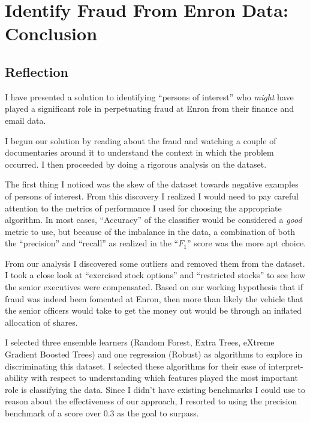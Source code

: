 \documentclass[titlepage,numbers=noenddot,headinclude,%
               footinclude=true,abstractoff,BCOR=5mm,%
               paper=a4,fontsize=11pt,ngerman,american]{scrreprt}
\numberwithin{theorem}{chapter}
\numberwithin{definition}{chapter}
\numberwithin{algorithm}{chapter}
\numberwithin{figure}{chapter}
\numberwithin{table}{chapter}
\numberwithin{equation}{chapter}
\begin{document}

\chapter*{Identify Fraud From Enron Data: Conclusion}


\section*{Reflection}

I have presented a solution to identifying ``persons of interest'' who \textit{might} have played a significant role in perpetuating fraud at Enron from their finance and email data.

I begun our solution by reading about the fraud and watching a couple of documentaries around it to understand the context in which the problem occurred. I then proceeded by doing a rigorous analysis on the dataset.

The first thing I noticed was the skew of the dataset towards negative examples of persons of interest. From this discovery I realized I would need to pay careful attention to the metrics of performance I used for choosing the appropriate algorithm. In most cases, ``Accuracy'' of the classifier would be considered a \textit{good} metric to use, but because of the imbalance in the data, a combination of both the ``precision'' and ``recall'' as realized in the ``$F_1$'' score was the more apt choice.

From our analysis I discovered some outliers and removed them from the dataset. I took a close look at ``exercised stock options'' and ``restricted stocks'' to see how the senior executives were compensated. Based on our working hypothesis that if fraud was indeed been fomented at Enron, then more than likely the vehicle that the senior officers would take to get the money out would be through an inflated allocation of shares.

I selected three ensemble learners (Random Forest, Extra Trees, eXtreme Gradient Boosted Trees) and one regression (Robust) as algorithms to explore in discriminating this dataset. I selected these algorithms for their ease of interpret-ability with respect to understanding which features played the most important role is classifying the data. Since I didn't have existing benchmarks I could use to reason about the effectiveness of our approach, I resorted to using the precision benchmark of a score over 0.3 as the goal to surpass.
\end{document}
